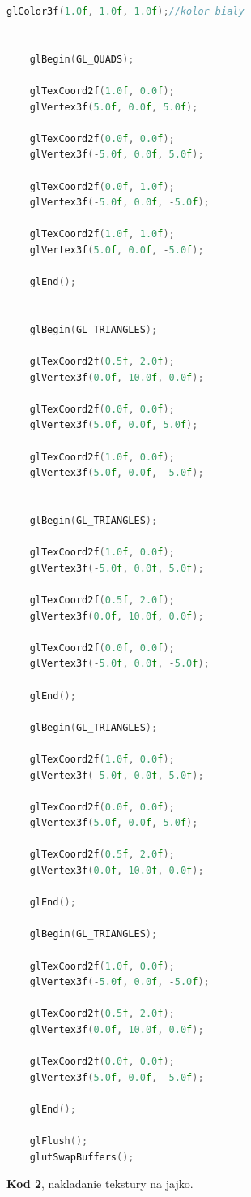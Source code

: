 \documentclass[polish,polish,a4paper]{article}
\begin{document}
{\small
\begin{lstlisting}[language=C++]
	glColor3f(1.0f, 1.0f, 1.0f);//kolor bialy
	

	glBegin(GL_QUADS);

	glTexCoord2f(1.0f, 0.0f);
	glVertex3f(5.0f, 0.0f, 5.0f);

	glTexCoord2f(0.0f, 0.0f);
	glVertex3f(-5.0f, 0.0f, 5.0f);

	glTexCoord2f(0.0f, 1.0f);
	glVertex3f(-5.0f, 0.0f, -5.0f);

	glTexCoord2f(1.0f, 1.0f);
	glVertex3f(5.0f, 0.0f, -5.0f);
	
	glEnd();


	glBegin(GL_TRIANGLES);

	glTexCoord2f(0.5f, 2.0f);
	glVertex3f(0.0f, 10.0f, 0.0f);

	glTexCoord2f(0.0f, 0.0f);
	glVertex3f(5.0f, 0.0f, 5.0f);

	glTexCoord2f(1.0f, 0.0f);
	glVertex3f(5.0f, 0.0f, -5.0f);


	glBegin(GL_TRIANGLES);

	glTexCoord2f(1.0f, 0.0f);
	glVertex3f(-5.0f, 0.0f, 5.0f);

	glTexCoord2f(0.5f, 2.0f);
	glVertex3f(0.0f, 10.0f, 0.0f);

	glTexCoord2f(0.0f, 0.0f);
	glVertex3f(-5.0f, 0.0f, -5.0f);

	glEnd();

	glBegin(GL_TRIANGLES);

	glTexCoord2f(1.0f, 0.0f);
	glVertex3f(-5.0f, 0.0f, 5.0f);

	glTexCoord2f(0.0f, 0.0f);
	glVertex3f(5.0f, 0.0f, 5.0f);

	glTexCoord2f(0.5f, 2.0f);
	glVertex3f(0.0f, 10.0f, 0.0f);

	glEnd();

	glBegin(GL_TRIANGLES);

	glTexCoord2f(1.0f, 0.0f);
	glVertex3f(-5.0f, 0.0f, -5.0f);

	glTexCoord2f(0.5f, 2.0f);
	glVertex3f(0.0f, 10.0f, 0.0f);

	glTexCoord2f(0.0f, 0.0f);
	glVertex3f(5.0f, 0.0f, -5.0f);

	glEnd();

	glFlush();
	glutSwapBuffers();

\end{lstlisting}
}
\textbf{Kod 2}, nakladanie tekstury na jajko.
\end{document}
